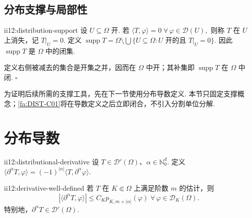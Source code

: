 \subsection{分布支撑与局部性}

\begin{FADefinition}[B][分布的支撑]{ii12:distribution-support}
设 \(\displaystyle U\subseteq\Omega\) 开. 若 \(\displaystyle \langle T,\varphi\rangle=0 \; \forall\,\varphi\in\mathcal D(U),\)
则称 \(\displaystyle T\) 在 \(\displaystyle U\) 上消失，记 \(\displaystyle T|_U=0\). 定义 \(\displaystyle \operatorname{supp}T = \Omega\setminus \bigcup\{U\subseteq\Omega:U\text{ 开的且 }T|_U=0\}.\)
因此 \(\displaystyle\operatorname{supp}T\) 是 \(\displaystyle\Omega\) 中的闭集.
\end{FADefinition}

\begin{FAProof}
定义右侧被减去的集合是开集之并，因而在 \(\displaystyle\Omega\) 中开；其补集即 \(\displaystyle\operatorname{supp}T\) 在 \(\displaystyle\Omega\) 中闭.
\hfill\(\square\)
\end{FAProof}

为证明后续所需的支撑工具，先在下一节使用分布导数定义. 本节只固定支撑概念；\autoref{fa:DIST-C01}将在导数定义之后立即闭合，不引入分割单位分解.

\section{分布导数}\label{sec:ii12-distributional-derivative}

\begin{FADefinition}[A][分布导数]{ii12:distributional-derivative}
设 \(\displaystyle T\in\mathcal D'(\Omega)\)、\(\displaystyle\alpha\in\mathbb N_0^d\). 定义 \(\displaystyle \langle\partial^\alpha T,\varphi\rangle = (-1)^{|\alpha|}\langle T,\partial^\alpha\varphi\rangle.\)
\end{FADefinition}

\begin{FAProposition}[B][分布导数仍为分布]{ii12:derivative-well-defined}
若 \(\displaystyle T\) 在 \(\displaystyle K\Subset\Omega\) 上满足阶数 \(\displaystyle m\) 的估计，则
\[
|\langle\partial^\alpha T,\varphi\rangle|
\leqslant
C_Kp_{K,m+|\alpha|}(\varphi)
\;
\forall\,\varphi\in\mathcal D_K(\Omega).
\]
特别地，\(\displaystyle\partial^\alpha T\in\mathcal D'(\Omega)\).
\end{FAProposition}

